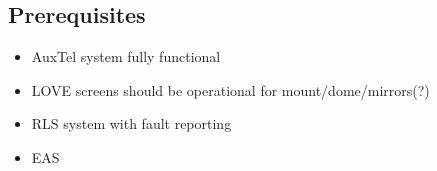 \subsection{Prerequisites}
\begin{itemize}
\item AuxTel system fully functional
\item LOVE screens should be operational for mount/dome/mirrors(?)
\item RLS system with fault reporting
\item EAS
\end{itemize}

